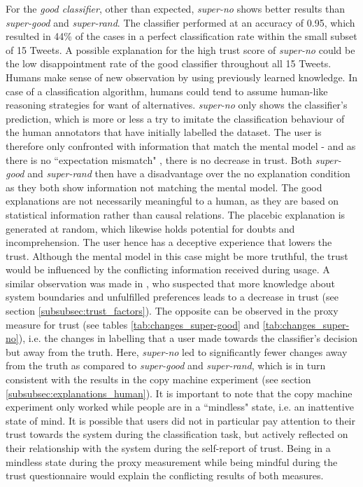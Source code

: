 For the \textit{good classifier}, other than expected, \textit{super-no} shows better results than \textit{super-good} and \textit{super-rand}. The classifier performed at an accuracy of 0.95, which resulted in 44\% of the cases in a perfect classification rate within the small subset of 15 Tweets. A possible explanation for the high trust score of \textit{super-no} could be the low disappointment rate of the good classifier throughout all 15 Tweets. Humans make sense of new observation by using previously learned knowledge. In case of a classification algorithm, humans could tend to assume human-like reasoning strategies for want of alternatives. \textit{super-no} only shows the classifier's prediction, which is more or less a try to imitate the classification behaviour of the human annotators that have initially labelled the dataset. The user is therefore only confronted with information that match the mental model - and as there is no ``expectation mismatch" \cite{glass2008toward}, there is no decrease in trust. Both \textit{super-good} and \textit{super-rand} then have a disadvantage over the no explanation condition as they both show information not matching the mental model. The good explanations are not necessarily meaningful to a human, as they are based on statistical information rather than causal relations. The placebic explanation is generated at random, which likewise holds potential for doubts and incomprehension. The user hence has a deceptive experience that lowers the trust. Although the mental model in this case might be more truthful, the trust would be influenced by the conflicting information received during usage. A similar observation was made in \cite{cramer2008effects}, who suspected that more knowledge about system boundaries and unfulfilled preferences leads to a decrease in trust (see section \ref{subsubsec:trust_factors}). The opposite can be observed in the proxy measure for trust (see tables \ref{tab:changes_super-good} and \ref{tab:changes_super-no}), i.e. the changes in labelling that a user made towards the classifier's decision but away from the truth. Here, \textit{super-no} led to significantly fewer changes away from the truth as compared to \textit{super-good} and \textit{super-rand}, which is in turn consistent with the results in the copy machine experiment (see section \ref{subsubsec:explanations_human}). It is important to note that the copy machine experiment only worked while people are in a ``mindless" state, i.e. an inattentive state of mind. It is possible that users did not in particular pay attention to their trust towards the system during the classification task, but actively reflected on their relationship with the system during the self-report of trust. Being in a mindless state during the proxy measurement while being mindful during the trust questionnaire would explain the conflicting results of both measures.\newline
